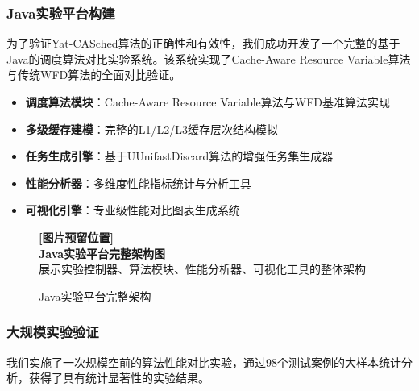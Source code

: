 \subsubsection{Java实验平台构建}

为了验证Yat-CASched算法的正确性和有效性，我们成功开发了一个完整的基于Java的调度算法对比实验系统。该系统实现了Cache-Aware Resource Variable算法与传统WFD算法的全面对比验证。

\begin{tcolorbox}[
    colback=blue!5!white,
    colframe=blue!50!black,
    title=\textbf{实验平台核心架构},
    fonttitle=\bfseries,
    arc=3pt
]
\begin{itemize}
    \item \textbf{调度算法模块}：Cache-Aware Resource Variable算法与WFD基准算法实现
    \item \textbf{多级缓存建模}：完整的L1/L2/L3缓存层次结构模拟
    \item \textbf{任务生成引擎}：基于UUnifastDiscard算法的增强任务集生成器
    \item \textbf{性能分析器}：多维度性能指标统计与分析工具
    \item \textbf{可视化引擎}：专业级性能对比图表生成系统
\end{itemize}
\end{tcolorbox}

\begin{figure}[htbp]
\centering
\begin{tcolorbox}[
    colback=gray!10,
    colframe=gray!50,
    width=0.9\textwidth,
    center,
    arc=3pt
]
\centering
\textbf{[图片预留位置]}\\
\textbf{Java实验平台完整架构图}\\
\footnotesize{展示实验控制器、算法模块、性能分析器、可视化工具的整体架构}
\end{tcolorbox}
\caption{Java实验平台完整架构}
\label{fig:java_platform}
\end{figure}

\subsubsection{大规模实验验证}

我们实施了一次规模空前的算法性能对比实验，通过98个测试案例的大样本统计分析，获得了具有统计显著性的实验结果。

